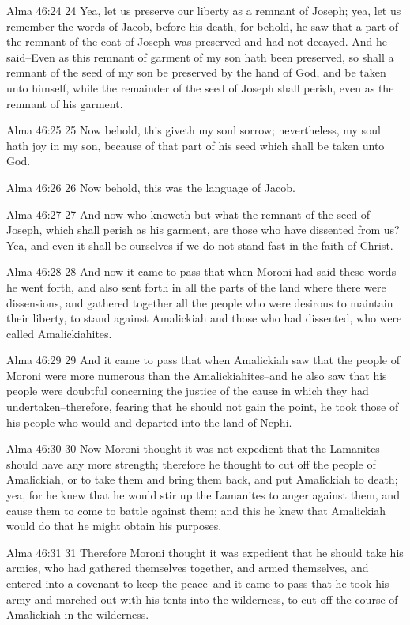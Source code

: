 Alma 46:24
 24 Yea, let us preserve our liberty as a remnant of Joseph; yea,
let us remember the words of Jacob, before his death, for behold,
he saw that a part of the remnant of the coat of Joseph was
preserved and had not decayed. And he said--Even as this remnant
of garment of my son hath been preserved, so shall a remnant of
the seed of my son be preserved by the hand of God, and be taken
unto himself, while the remainder of the seed of Joseph shall
perish, even as the remnant of his garment.

Alma 46:25
 25 Now behold, this giveth my soul sorrow; nevertheless, my soul
hath joy in my son, because of that part of his seed which shall
be taken unto God.

Alma 46:26
 26 Now behold, this was the language of Jacob.

Alma 46:27
 27 And now who knoweth but what the remnant of the seed of
Joseph, which shall perish as his garment, are those who have
dissented from us? Yea, and even it shall be ourselves if we do
not stand fast in the faith of Christ.

Alma 46:28
 28 And now it came to pass that when Moroni had said these words
he went forth, and also sent forth in all the parts of the land
where there were dissensions, and gathered together all the
people who were desirous to maintain their liberty, to stand
against Amalickiah and those who had dissented, who were called
Amalickiahites.

Alma 46:29
 29 And it came to pass that when Amalickiah saw that the people
of Moroni were more numerous than the Amalickiahites--and he also
saw that his people were doubtful concerning the justice of the
cause in which they had undertaken--therefore, fearing that he
should not gain the point, he took those of his people who would
and departed into the land of Nephi.

Alma 46:30
 30 Now Moroni thought it was not expedient that the Lamanites
should have any more strength; therefore he thought to cut off
the people of Amalickiah, or to take them and bring them back,
and put Amalickiah to death; yea, for he knew that he would stir
up the Lamanites to anger against them, and cause them to come to
battle against them; and this he knew that Amalickiah would do
that he might obtain his purposes.

Alma 46:31
 31 Therefore Moroni thought it was expedient that he should take
his armies, who had gathered themselves together, and armed
themselves, and entered into a covenant to keep the peace--and it
came to pass that he took his army and marched out with his tents
into the wilderness, to cut off the course of Amalickiah in the
wilderness.

